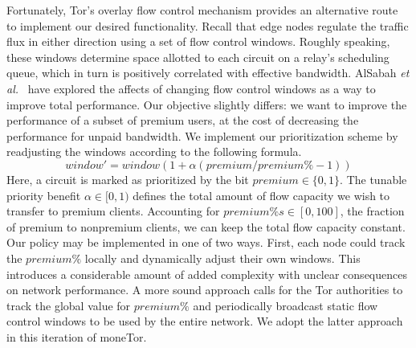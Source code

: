 Fortunately, Tor's overlay flow control mechanism provides an alternative route
to implement our desired functionality. Recall that edge nodes regulate the
traffic flux in either direction using a set of flow control windows. Roughly
speaking, these windows determine space allotted to each circuit on a relay's
scheduling queue, which in turn is positively correlated with effective
bandwidth. AlSabah \textit{et al.}~\cite{pets2011-defenestrator} have explored
the affects of changing flow control windows as a way to improve total
performance. Our objective slightly differs: we want to improve the performance
of a subset of premium users, at the cost of decreasing the performance for
unpaid bandwidth.  We implement our prioritization scheme by readjusting the
windows according to the following formula.
\begin{equation}
  window' = window(1+ \alpha(premium / premium\% - 1))
  \label{eq:flow}
\end{equation}
Here, a circuit is marked as prioritized by the bit $premium \in \{0, 1\}$. The
tunable priority benefit $\alpha \in [0, 1)$ defines the total amount of flow
capacity we wish to transfer to premium clients. Accounting for
$premium\%s \in [0,100]$, the fraction of premium to nonpremium clients, we can
keep the total flow capacity constant. Our policy may be implemented in one of
two ways. First, each node could track the $premium\%$ locally and dynamically
adjust their own windows. This introduces a considerable amount of added
complexity with unclear consequences on network performance. A more sound
approach calls for the Tor authorities to track the global value for $premium\%$
and periodically broadcast static flow control windows to be used by the entire
network. We adopt the latter approach in this iteration of moneTor.
